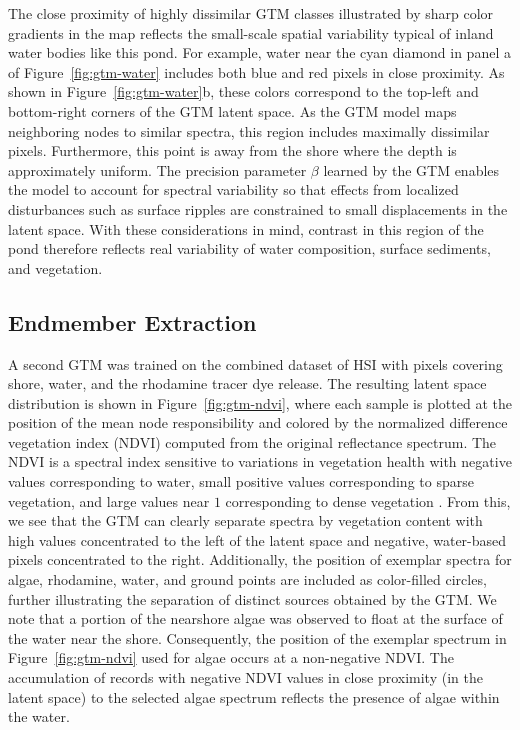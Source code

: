 The close proximity of highly dissimilar GTM classes illustrated by sharp color
gradients in the map reflects the small-scale spatial variability typical of
inland water bodies like this pond. For example, water near the cyan diamond in
panel a of Figure~\ref{fig:gtm-water} includes both blue and red pixels in close
proximity. As shown in Figure~\ref{fig:gtm-water}b, these colors correspond to
the top-left and bottom-right corners of the GTM latent space. As the GTM model
maps neighboring nodes to similar spectra, this region includes maximally
dissimilar pixels. Furthermore, this point is away from the shore where the
depth is approximately uniform. The precision parameter $\beta$ learned by the
GTM enables the model to account for spectral variability so that effects from
localized disturbances such as surface ripples are constrained to small
displacements in the latent space. With these considerations in mind, contrast
in this region of the pond therefore reflects real variability of water
composition, surface sediments, and vegetation.


\subsection{Endmember Extraction}

A second GTM was trained on the combined dataset of HSI with pixels covering
shore, water, and the rhodamine tracer dye release. The resulting latent space
distribution is shown in Figure~\ref{fig:gtm-ndvi}, where each sample is plotted
at the position of the mean node responsibility and colored by the normalized
difference vegetation index (NDVI) computed from the original reflectance
spectrum. The NDVI is a spectral index sensitive to variations in vegetation
health with negative values corresponding to water, small positive values
corresponding to sparse vegetation, and large values near $1$ corresponding to
dense vegetation \cite{thenkabail2018hyperspectral}. From this, we see that the
GTM can clearly separate spectra by vegetation content with high values
concentrated to the left of the latent space and negative, water-based pixels
concentrated to the right. Additionally, the position of exemplar spectra for
algae, rhodamine, water, and ground points are included as color-filled circles,
further illustrating the separation of distinct sources obtained by the GTM. We
note that a portion of the nearshore algae was observed to float at the surface
of the water near the shore. Consequently, the position of the exemplar spectrum
in Figure~\ref{fig:gtm-ndvi} used for algae occurs at a non-negative NDVI. The
accumulation of records with negative NDVI values in close proximity (in the
latent space) to the selected algae spectrum reflects the presence of algae
within the water.


